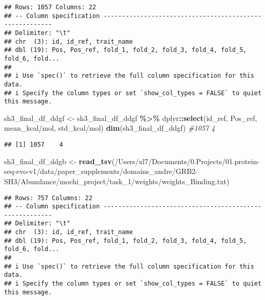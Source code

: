 \documentclass[
]{article}
\newenvironment{Shaded}{\begin{snugshade}}{\end{snugshade}}
\newcommand{\AttributeTok}[1]{\textcolor[rgb]{0.13,0.29,0.53}{#1}}
\newcommand{\CommentTok}[1]{\textcolor[rgb]{0.56,0.35,0.01}{\textit{#1}}}
\newcommand{\FunctionTok}[1]{\textcolor[rgb]{0.13,0.29,0.53}{\textbf{#1}}}
\newcommand{\NormalTok}[1]{#1}
\newcommand{\OtherTok}[1]{\textcolor[rgb]{0.56,0.35,0.01}{#1}}
\newcommand{\SpecialCharTok}[1]{\textcolor[rgb]{0.81,0.36,0.00}{\textbf{#1}}}
\newcommand{\StringTok}[1]{\textcolor[rgb]{0.31,0.60,0.02}{#1}}
\begin{document}
\begin{verbatim}
## Rows: 1057 Columns: 22
## -- Column specification --------------------------------------------------------
## Delimiter: "\t"
## chr  (3): id, id_ref, trait_name
## dbl (19): Pos, Pos_ref, fold_1, fold_2, fold_3, fold_4, fold_5, fold_6, fold...
## 
## i Use `spec()` to retrieve the full column specification for this data.
## i Specify the column types or set `show_col_types = FALSE` to quiet this message.
\end{verbatim}

\begin{Shaded}
\begin{Highlighting}[]
\NormalTok{sh3\_final\_df\_ddgf }\OtherTok{\textless{}{-}}\NormalTok{ sh3\_final\_df\_ddgf }\SpecialCharTok{\%\textgreater{}\%}\NormalTok{ dplyr}\SpecialCharTok{::}\FunctionTok{select}\NormalTok{(id\_ref, Pos\_ref, }\StringTok{\textasciigrave{}}\AttributeTok{mean\_kcal/mol}\StringTok{\textasciigrave{}}\NormalTok{, }\StringTok{\textasciigrave{}}\AttributeTok{std\_kcal/mol}\StringTok{\textasciigrave{}}\NormalTok{)}
\FunctionTok{dim}\NormalTok{(sh3\_final\_df\_ddgf) }\CommentTok{\#1057    4}
\end{Highlighting}
\end{Shaded}

\begin{verbatim}
## [1] 1057    4
\end{verbatim}

\begin{Shaded}
\begin{Highlighting}[]
\NormalTok{sh3\_final\_df\_ddgb }\OtherTok{\textless{}{-}} \FunctionTok{read\_tsv}\NormalTok{(}\StringTok{\textquotesingle{}/Users/xl7/Documents/0.Projects/01.protein{-}seq{-}evo{-}v1/data/paper\_supplements/domains\_andre/GRB2{-}SH3/Abundance/mochi\_project/task\_1/weights/weights\_Binding.txt\textquotesingle{}}\NormalTok{)}
\end{Highlighting}
\end{Shaded}

\begin{verbatim}
## Rows: 757 Columns: 22
## -- Column specification --------------------------------------------------------
## Delimiter: "\t"
## chr  (3): id, id_ref, trait_name
## dbl (19): Pos, Pos_ref, fold_1, fold_2, fold_3, fold_4, fold_5, fold_6, fold...
## 
## i Use `spec()` to retrieve the full column specification for this data.
## i Specify the column types or set `show_col_types = FALSE` to quiet this message.
\end{verbatim}
\end{document}
